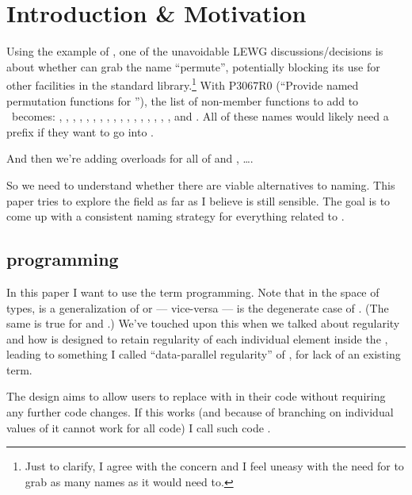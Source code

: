 \pagestyle{scrheadings}




\section{Introduction \& Motivation}

Using the example of \std{}, one of the unavoidable
LEWG discussions/decisions is about whether  can grab the name
“permute”, potentially blocking its use for other facilities in the standard
library.\footnote{Just to clarify, I agree with the concern and I feel uneasy
with the need for  to grab as many names as it would need to.}
With P3067R0 (“Provide named permutation functions for \std{}”), the
list of non-member functions to add to \std\ becomes:
, , , , ,
, , , ,
, , , , ,
, , , and .
All of these names would likely need a  prefix if they want to go
into \std.

And then we're adding \simd overloads for all of  and
, \ldots.

So we need to understand whether there are viable alternatives to 
naming.
This paper tries to explore the field as far as I believe is still sensible.
The goal is to come up with a consistent naming strategy for everything related
to .

\subsection{\simdgeneric programming}

In this paper I want to use the term \emph{\simdgeneric} programming.
Note that in the space of types, \simdT is a generalization of  or ---
vice-versa ---  is the degenerate case of \simdT.
(The same is true for \mask and .)
We've touched upon this when we talked about regularity and how \simdT is
designed to retain regularity of each individual element inside the \simd,
leading to something I called “data-parallel regularity” of \simdT, for lack of
an existing term.

The  design aims to allow users to replace  with \simdT in
their code without requiring any further code changes.
If this works (and because of branching on individual values of  it
cannot work for all code) I call such code \simdgeneric.

